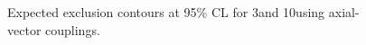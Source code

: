 \begin{figure}[h!]
  \centering
  \caption{\label{fig:limits_A} Expected exclusion contours at 95\% CL for 3\fbinv and 10\fbinv using axial-vector couplings. }
\end{figure}


